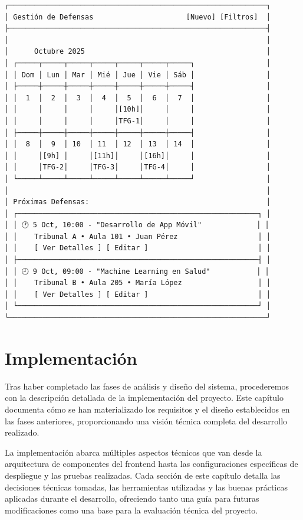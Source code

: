 \documentclass[12pt,a4paper,oneside]{report}
\begin{document}
\begin{lstlisting}
┌─────────────────────────────────────────────────────────────┐
│ Gestión de Defensas                      [Nuevo] [Filtros]  │
├─────────────────────────────────────────────────────────────┤
│                                                             │
│      Octubre 2025                                           │
│ ┌─────┬─────┬─────┬─────┬─────┬─────┬─────┐                 │
│ │ Dom │ Lun │ Mar │ Mié │ Jue │ Vie │ Sáb │                 │
│ ├─────┼─────┼─────┼─────┼─────┼─────┼─────┤                 │
│ │  1  │  2  │  3  │  4  │  5  │  6  │  7  │                 │
│ │     │     │     │     │[10h]│     │     │                 │
│ │     │     │     │     │TFG-1│     │     │                 │
│ ├─────┼─────┼─────┼─────┼─────┼─────┼─────┤                 │
│ │  8  │  9  │ 10  │ 11  │ 12  │ 13  │ 14  │                 │
│ │     │[9h] │     │[11h]│     │[16h]│     │                 │
│ │     │TFG-2│     │TFG-3│     │TFG-4│     │                 │
│ └─────┴─────┴─────┴─────┴─────┴─────┴─────┘                 │
│                                                             │
│ Próximas Defensas:                                          │
│ ┌─────────────────────────────────────────────────────────┐ │
│ │ 🕐 5 Oct, 10:00 - "Desarrollo de App Móvil"             │ │
│ │    Tribunal A • Aula 101 • Juan Pérez                   │ │
│ │    [ Ver Detalles ] [ Editar ]                          │ │
│ ├─────────────────────────────────────────────────────────┤ │
│ │ 🕘 9 Oct, 09:00 - "Machine Learning en Salud"           │ │
│ │    Tribunal B • Aula 205 • María López                  │ │
│ │    [ Ver Detalles ] [ Editar ]                          │ │
│ └─────────────────────────────────────────────────────────┘ │
└─────────────────────────────────────────────────────────────┘
\end{lstlisting}

\chapter{Implementación}\label{implementaciuxf3n}
Tras haber completado las fases de análisis y diseño del sistema,
procederemos con la descripción detallada de la implementación del
proyecto. Este capítulo documenta cómo se han materializado los
requisitos y el diseño establecidos en las fases anteriores,
proporcionando una visión técnica completa del desarrollo realizado.

La implementación abarca múltiples aspectos técnicos que van desde la
arquitectura de componentes del frontend hasta las configuraciones
específicas de despliegue y las pruebas realizadas. Cada sección de este
capítulo detalla las decisiones técnicas tomadas, las herramientas
utilizadas y las buenas prácticas aplicadas durante el desarrollo,
ofreciendo tanto una guía para futuras modificaciones como una base para
la evaluación técnica del proyecto.
\end{document}
